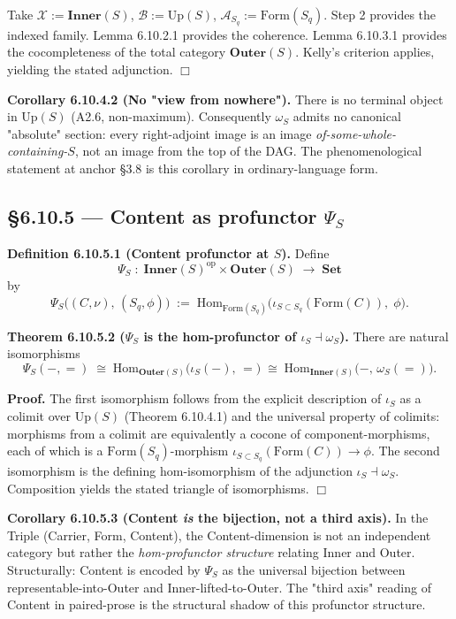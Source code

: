 \documentclass[11pt, openany]{book}
\begin{document}
Take $\mathcal{X} := \mathbf{Inner}(S)$, $\mathcal{B} := \mathrm{Up}(S)$, $\mathcal{A}_{S_q} := \mathrm{Form}(S_q)$. Step 2 provides the indexed family. Lemma 6.10.2.1 provides the coherence. Lemma 6.10.3.1 provides the cocompleteness of the total category $\mathbf{Outer}(S)$. Kelly's criterion applies, yielding the stated adjunction. $\Box$

\textbf{Corollary 6.10.4.2 (No "view from nowhere").} There is no terminal object in $\mathrm{Up}(S)$ (A2.6, non-maximum). Consequently $\omega_S$ admits no canonical "absolute" section: every right-adjoint image is an image \textit{of-some-whole-containing-$S$}, not an image from the top of the DAG. The phenomenological statement at anchor §3.8 is this corollary in ordinary-language form.

\subsection{§6.10.5 --- Content as profunctor $\Psi_S$}

\textbf{Definition 6.10.5.1 (Content profunctor at $S$).} Define
\[
\Psi_S \;:\; \mathbf{Inner}(S)^{\mathrm{op}} \times \mathbf{Outer}(S) \;\longrightarrow\; \mathbf{Set}
\]
by
\[
\Psi_S\bigl( (C, \nu), \, (S_q, \phi) \bigr) \;:=\; \mathrm{Hom}_{\mathrm{Form}(S_q)}\bigl( \iota_{S \subset S_q}(\mathrm{Form}(C)), \; \phi \bigr).
\]

\textbf{Theorem 6.10.5.2 ($\Psi_S$ is the hom-profunctor of $\iota_S \dashv \omega_S$).} There are natural isomorphisms
\[
\Psi_S(-, =) \;\cong\; \mathrm{Hom}_{\mathbf{Outer}(S)}\bigl( \iota_S(-), \, = \bigr) \;\cong\; \mathrm{Hom}_{\mathbf{Inner}(S)}\bigl( -, \, \omega_S(=) \bigr).
\]

\textbf{Proof.} The first isomorphism follows from the explicit description of $\iota_S$ as a colimit over $\mathrm{Up}(S)$ (Theorem 6.10.4.1) and the universal property of colimits: morphisms from a colimit are equivalently a cocone of component-morphisms, each of which is a $\mathrm{Form}(S_q)$-morphism $\iota_{S \subset S_q}(\mathrm{Form}(C)) \to \phi$. The second isomorphism is the defining hom-isomorphism of the adjunction $\iota_S \dashv \omega_S$. Composition yields the stated triangle of isomorphisms. $\Box$

\textbf{Corollary 6.10.5.3 (Content \textit{is} the bijection, not a third axis).} In the Triple (Carrier, Form, Content), the Content-dimension is not an independent category but rather the \textit{hom-profunctor structure} relating Inner and Outer. Structurally: Content is encoded by $\Psi_S$ as the universal bijection between representable-into-Outer and Inner-lifted-to-Outer. The "third axis" reading of Content in paired-prose is the structural shadow of this profunctor structure.
\end{document}
